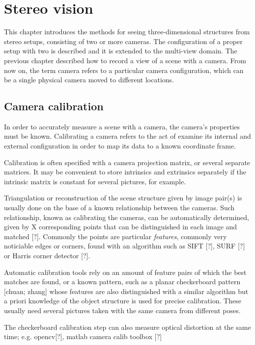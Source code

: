 \section{Stereo vision}

This chapter introduces the methods for seeing three-dimensional structures from stereo setups, consisting of two or more cameras.
The configuration of a proper setup with two is described and it is extended to the multi-view domain.
The previous chapter described how to record a view of a scene with a camera. From now on, the term camera refers to a particular camera configuration, which can be a single physical camera moved to different locations.

\subsection{Camera calibration}

In order to accurately measure a scene with a camera, the camera's properties must be known. Calibrating a camera refers to the act of examine its internal and external configuration in order to map its data to a known coordinate frame.

Calibration is often specified with a camera projection matrix, or several separate matrices.
It may be convenient to store intrinsics and extrinsics separately if the intrinsic matrix is constant for several pictures, for example.

Triangulation or reconstruction of the scene structure given by image pair(s) is usually done on the base of a known relationship between the cameras.
Such relationship, known as calibrating the cameras, can be automatically determined, given by X corresponding points that can be distinguished in each image and matched [?].
Commonly the points are particular \emph{features}, commonly very noticiable edges or corners, found with an algorithm such as SIFT [?], SURF [?] or Harris corner detector [?].

Automatic calibration tools rely on an amount of feature pairs of which the best matches are found, or a known pattern, such as a planar checkerboard pattern [chuan; zhang] whose features are also distinguished with a similar algorithm but a priori knowledge of the object structure is used for precise calibration.
These usually need several pictures taken with the same camera from different poses.

The checkerboard calibration step can also measure optical distortion at the same time; e.g. opencv[?], matlab camera calib toolbox [?]

